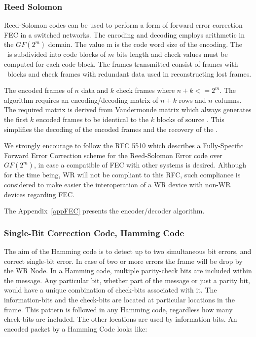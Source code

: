 \subsubsection{Reed Solomon}

Reed-Solomon codes can be used to perform a form of forward error correction FEC
in a switched networks. 
The encoding and decoding employs arithmetic in the $GF(2^m)$ domain. The
value m is the code word size of the encoding. 
The \ControlMessage\ is subdivided into code blocks of $m$ bits length and
check values must be computed for each code block. 
The frames transmitted consist of frames with \ControlMessage\ blocks and check
frames with redundant data used in reconstructing lost frames. 

The encoded frames of $n$ data and $k$ check frames where $n+k <= 2^m$. The
algorithm requires an encoding/decoding matrix of $n + k$ rows and $n$ columns.
The required matrix is derived from Vandermonde matrix which always generates
the first $k$ encoded frames to be identical to the $k$ blocks of source 
\ControlMessage. This simplifies the decoding of the encoded frames and the
recovery of the \ControlMessage.

We strongly encourage to follow the RFC 5510 \cite{reed_solomon} which
describes a Fully-Specific Forward Error Correction scheme for the Reed-Solomon
Error code over $GF(2^m)$, in case a compatible of FEC with other
systems is desired. Although for the time being, WR will not be compliant to
this RFC, such compliance is considered to make easier the interoperation of a
WR device with non-WR devices regarding FEC.

The Appendix~\ref{appFEC} presents the encoder/decoder algorithm. 



\subsubsection{Single-Bit Correction Code, Hamming Code}

The aim of the Hamming code is to detect up to two simultaneous bit
errors, and correct single-bit error. In case of two or more errors the frame
will be drop by the WR Node. In a Hamming code, multiple parity-check bits are
included within the message. Any particular bit, whether part of the
message or just a parity bit, would have a unique combination of check-bits
associated with it. The information-bits and the check-bits are located at
particular locations in the frame. This pattern is followed in any Hamming code,
regardless how many check-bits are included. The other locations are used by
information bits. An encoded packet by a Hamming Code looks like:

